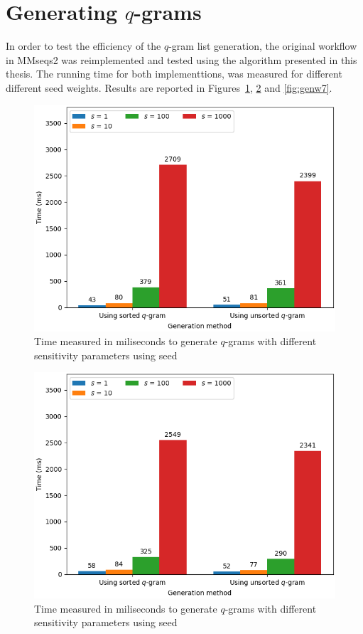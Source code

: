\documentclass[twoside,a4paper,bsc]{master}
\newcommand{\Qgram}[1]{\(#1\)-gram}
\begin{document}
\section{Generating \Qgram{q}s}
In order to test the efficiency of the \Qgram{q} list generation, the
original workflow in MMseqs2 was reimplemented and tested using the
algorithm presented in this thesis.
The running time for both implementtions, was measured for different
different seed weights. Results are reported in
Figures~\ref{fig:genw5}, \ref{fig:genw6} and \ref{fig:genw7}.
\begin{figure}
\centering
\includegraphics[scale=0.6]{graphics/gen_w5.png}
\caption{Time measured in miliseconds to generate \Qgram{q}s with
different sensitivity parameters using seed }
\label{fig:genw5}
\end{figure}
\begin{figure}
\centering
\includegraphics[scale=0.6]{graphics/gen_w6.png}
\caption{Time measured in miliseconds to generate \Qgram{q}s with
different sensitivity parameters using seed }
\label{fig:genw6}
\end{figure}
\end{document}
